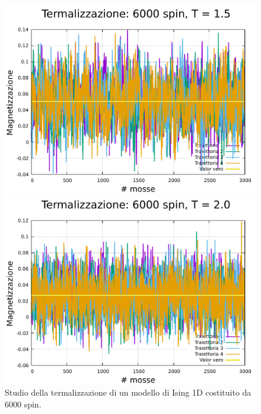 \begin{figure}[htbp]
    \begin{minipage}{0.45\textwidth}  
      \centering
      \includegraphics[page=1, width=\textwidth]{Immagini/simIsing1D/magn0.02/term/term_6000_1.5.pdf}
      \caption{$T\,=\,1.5$}
    \end{minipage}\hfill
    \begin{minipage}{0.45\textwidth}  
      \centering
      \includegraphics[page=1, width=\textwidth]{Immagini/simIsing1D/magn0.02/term/term_6000_2.0.pdf}
      \caption{$T\,=\,2.0$}
    \end{minipage}
    \caption{Studio della termalizzazione di un modello di Ising 1D costituito da 6000 spin.}
\end{figure}

